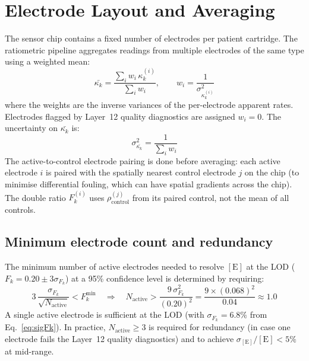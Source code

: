 \documentclass[10pt,a4paper]{article}
\numberwithin{equation}{section}
\newcommand{\kk}{\kappa_k}
\newcommand{\Fk}{F_k}
\begin{document}
\section{Electrode Layout and Averaging}
\label{sec:layout}

The sensor chip contains a fixed number of electrodes per patient cartridge.
The ratiometric pipeline aggregates readings from multiple electrodes of the
same type using a weighted mean:
\begin{equation}
  \bar{\kk} = \frac{\sum_i w_i\,\kk^{(i)}}{\sum_i w_i},
  \qquad
  w_i = \frac{1}{\sigma_{\kk^{(i)}}^2}
  \label{eq:wmean}
\end{equation}
where the weights are the inverse variances of the per-electrode apparent rates.
Electrodes flagged by Layer~12 quality diagnostics are assigned $w_i = 0$.
The uncertainty on $\bar{\kk}$ is:
\begin{equation}
  \sigma_{\bar{\kk}}^2 = \frac{1}{\sum_i w_i}
  \label{eq:sigkmean}
\end{equation}
The active-to-control electrode pairing is done before averaging: each
active electrode $i$ is paired with the spatially nearest control electrode
$j$ on the chip (to minimise differential fouling, which can have spatial
gradients across the chip). The double ratio $\Fk^{(i)}$ uses $\rho_\text{control}^{(j)}$
from its paired control, not the mean of all controls.

\subsection{Minimum electrode count and redundancy}

The minimum number of active electrodes needed to resolve $[\text{E}]$ at the
LOD ($\Fk = 0.20 \pm 3\sigma_{\Fk}$) at a 95\% confidence level is determined
by requiring:
\begin{equation}
  3\,\frac{\sigma_{\Fk}}{\sqrt{N_\text{active}}} < \Fk^\text{min}
  \quad \Rightarrow \quad
  N_\text{active} > \frac{9\,\sigma_{\Fk}^2}{(0.20)^2}
  = \frac{9 \times (0.068)^2}{0.04} \approx 1.0
  \label{eq:Nmin}
\end{equation}
A single active electrode is sufficient at the LOD (with $\sigma_{\Fk} = 6.8\%$
from Eq.~\ref{eq:sigFk}). In practice, $N_\text{active} \geq 3$ is required
for redundancy (in case one electrode fails the Layer~12 quality diagnostics)
and to achieve $\sigma_{[\text{E}]}/[\text{E}] < 5\%$ at mid-range.
\end{document}
